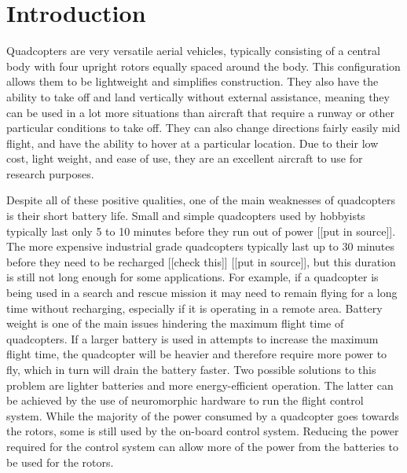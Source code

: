 \documentclass[letterpaper,12pt,titlepage,oneside,final]{book}
\begin{document}
\section{Introduction}


Quadcopters are very versatile aerial vehicles, typically consisting of a central body with four upright rotors equally spaced around the body. 
This configuration allows them to be lightweight and simplifies construction. 
They also have the ability to take off and land vertically without external assistance, meaning they can be used in a lot more situations than aircraft that require a runway or other particular conditions to take off. 
They can also change directions fairly easily mid flight, and have the ability to hover at a particular location. Due to their low cost, light weight, and ease of use, they are an excellent aircraft to use for research purposes.

Despite all of these positive qualities, one of the main weaknesses of quadcopters is their short battery life. 
Small and simple quadcopters used by hobbyists typically last only 5 to 10 minutes before they run out of power [[put in source]]. 
The more expensive industrial grade quadcopters typically last up to 30 minutes before they need to be recharged [[check this]] [[put in source]], but this duration is still not long enough for some applications. 
For example, if a quadcopter is being used in a search and rescue mission it may need to remain flying for a long time without recharging, especially if it is operating in a remote area. 
Battery weight is one of the main issues hindering the maximum flight time of quadcopters. 
If a larger battery is used in attempts to increase the maximum flight time, the quadcopter will be heavier and therefore require more power to fly, which in turn will drain the battery faster. 
Two possible solutions to this problem are lighter batteries and more energy-efficient operation.
The latter can be achieved by the use of neuromorphic hardware to run the flight control system.
While the majority of the power consumed by a quadcopter goes towards the rotors, some is still used by the on-board control system.
Reducing the power required for the control system can allow more of the power from the batteries to be used for the rotors.
\end{document}

